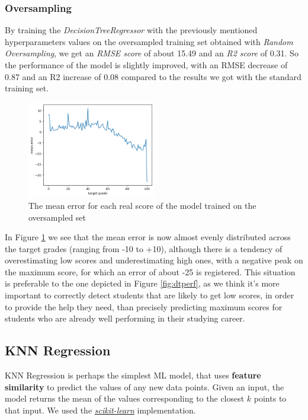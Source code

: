 \documentclass{article}
\begin{document}
\subsubsection{Oversampling}
By training the \textit{DecisionTreeRegressor} with the previously mentioned hyperparameters values on the oversampled training set obtained with \textit{Random Oversampling}, we get an \textit{RMSE score} of about 15.49 and an \textit{R2 score} of 0.31. So the performance of the model is slightly improved, with an RMSE decrease of 0.87 and an R2 increase of 0.08 compared to the results we got with the standard training set.

\begin{figure}[h!]
\centering
\includegraphics[width=0.5\textwidth]{DToversamp.png}
\caption{\label{fig:dtperfover}The mean error for each real score of the model trained on the oversampled set}
\end{figure}

In Figure \ref{fig:dtperfover} we see that the mean error is now almost evenly distributed across the target grades (ranging from -10 to +10), although there is a tendency of overestimating low scores and underestimating high ones, with a negative peak on the maximum score, for which an error of about -25 is registered. This situation is preferable to the one depicted in Figure \ref{fig:dtperf}, as we think it's more important to correctly detect students that are likely to get low scores, in order to provide the help they need, than precisely predicting maximum scores for students who are already well performing in their studying career.

\subsection{KNN Regression}
KNN Regression is perhaps the simplest ML model, that uses \textbf{feature similarity} to predict the values of any new data points. 
Given an input, the model returns the mean of the values corresponding to the closest $k$ points to that input.
We used the \textit{\href{https://scikit-learn.org/stable/modules/generated/sklearn.neighbors.KNeighborsClassifier.html}{scikit-learn}} implementation.
\end{document}
